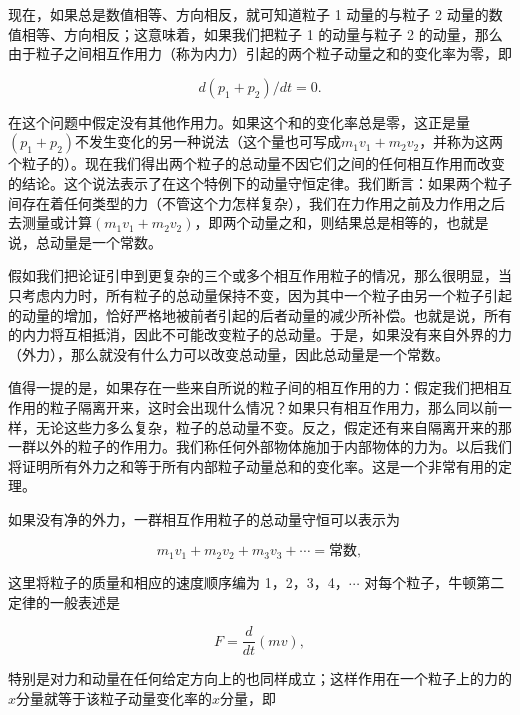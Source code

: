 \documentclass[12pt,oneside]{book}
\providecommand{\ddt}[2]{\frac{d#1}{d#2}}
\begin{document}
现在，如果总是数值相等、方向相反，就可知道粒子 1 动量的与粒子 2 动量的数值相等、方向相反；这意味着，如果我们把粒子 1 的动量与粒子 2 的动量，那么由于粒子之间相互作用力（称为内力）引起的两个粒子动量之和的变化率为零，即

\begin{equation}
\label{Eq:I:10:2}
d(p_1+p_2)/dt=0.
\end{equation}

在这个问题中假定没有其他作用力。如果这个和的变化率总是零，这正是量$(p_1 + p_2)$不发生变化的另一种说法（这个量也可写成$m_1v_1 + m_2v_2$，并称为这两个粒子的）。现在我们得出两个粒子的总动量不因它们之间的任何相互作用而改变的结论。这个说法表示了在这个特例下的动量守恒定律。我们断言：如果两个粒子间存在着任何类型的力（不管这个力怎样复杂），我们在力作用之前及力作用之后去测量或计算$(m_1v_1 + m_2v_2)$，即两个动量之和，则结果总是相等的，也就是说，总动量是一个常数。

假如我们把论证引申到更复杂的三个或多个相互作用粒子的情况，那么很明显，当只考虑内力时，所有粒子的总动量保持不变，因为其中一个粒子由另一个粒子引起的动量的增加，恰好严格地被前者引起的后者动量的减少所补偿。也就是说，所有的内力将互相抵消，因此不可能改变粒子的总动量。于是，如果没有来自外界的力（外力），那么就没有什么力可以改变总动量，因此总动量是一个常数。

值得一提的是，如果存在一些来自所说的粒子间的相互作用的力：假定我们把相互作用的粒子隔离开来，这时会出现什么情况？如果只有相互作用力，那么同以前一样，无论这些力多么复杂，粒子的总动量不变。反之，假定还有来自隔离开来的那一群以外的粒子的作用力。我们称任何外部物体施加于内部物体的力为。以后我们将证明所有外力之和等于所有内部粒子动量总和的变化率。这是一个非常有用的定理。

如果没有净的外力，一群相互作用粒子的总动量守恒可以表示为

\begin{equation}
\label{Eq:I:10:3}
m_1v_1+m_2v_2+m_3v_3+\dotsb=\text{常数},
\end{equation}

这里将粒子的质量和相应的速度顺序编为 1，2，3，4，$\cdots$ 对每个粒子，牛顿第二定律的一般表述是

\begin{equation}
\label{Eq:I:10:4}
F=\ddt{}{t}(mv),
\end{equation}

特别是对力和动量在任何给定方向上的也同样成立；这样作用在一个粒子上的力的$x$分量就等于该粒子动量变化率的$x$分量，即
\end{document}
